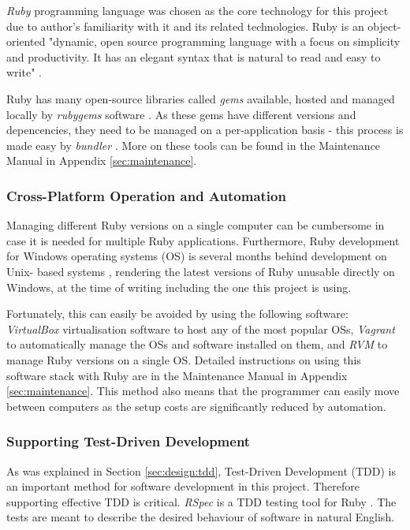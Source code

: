 \textit{Ruby} programming language was chosen as the core technology for this
project due to author's familiarity with it and its related technologies. Ruby
is an object-oriented "dynamic, open source programming language with a focus
on simplicity and productivity. It has an elegant syntax that is natural to
read and easy to write" \parencite{Ruby}.

Ruby has many open-source libraries called \textit{gems} available, hosted and
managed locally by \textit{rubygems} software \parencite{Rubygems}. As these
gems have different versions and depencencies, they need to be managed on a
per-application basis - this process is made easy by \textit{bundler}
\parencite{Bundler}. More on these tools can be found in the Maintenance Manual
in Appendix \ref{sec:maintenance}.

\subsubsection{Cross-Platform Operation and Automation}

Managing different Ruby versions on a single computer can be cumbersome in case
it is needed for multiple Ruby applications. Furthermore, Ruby development for
Windows operating systems (OS) is several months behind development on Unix-
based systems \parencite{Ruby}, rendering the latest versions of Ruby unusable
directly on Windows, at the time of writing including the one this project is
using.

Fortunately, this can easily be avoided by using the following software:
\textit{VirtualBox} \parencite{Virtualbox} virtualisation software to host any
of the most popular OSs, \textit{Vagrant} \parencite{Vagrant} to automatically
manage the OSs and software installed on them, and \textit{RVM} \parencite{Rvm}
to manage Ruby versions on a single OS. Detailed instructions on using this
software stack with Ruby are in the Maintenance Manual in Appendix
\ref{sec:maintenance}. This method also means that the programmer can easily
move between computers as the setup costs are significantly reduced by
automation.


\subsubsection{Supporting Test-Driven Development}
\label{sec:design:software:tdd}

As was explained in Section \ref{sec:design:tdd}, Test-Driven Development (TDD)
is an important method for software development in this project. Therefore
supporting effective TDD is critical. \textit{RSpec} is a TDD testing tool for
Ruby \parencite{Rspec}. The tests are meant to describe the desired behaviour of
software in natural English.

